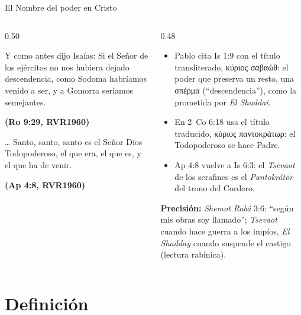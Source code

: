 \documentclass[hyperref={bookmarks=false},aspectratio=169]{beamer}
\newcommand{\grc}[1]{\foreignlanguage{ancientgreek}{#1}}
\newcommand{\fuente}[1]{\par\hfill{\upshape\bfseries\footnotesize\textcolor{azul}{#1}}}
\newcommand{\precision}[1]{{\footnotesize\color{gris}\textbf{Precisión:} #1}}
\begin{document}
\begin{frame}{El Nombre del poder en Cristo}
\begin{columns}[t,onlytextwidth]
\begin{column}{0.50\textwidth}
\begin{cita}Y como antes dijo Isaías: Si el Señor de los ejércitos no nos hubiera dejado descendencia, como Sodoma habríamos venido a ser, y a Gomorra seríamos semejantes.\fuente{(Ro 9:29, RVR1960)}\end{cita}
\begin{cita}[fontupper=\scriptsize\itshape]\ldots{} Santo, santo, santo es el Señor Dios Todopoderoso, el que era, el que es, y el que ha de venir.\fuente{(Ap 4:8, RVR1960)}\end{cita}
\end{column}
\begin{column}{0.48\textwidth}\small
\begin{itemize}
\item Pablo cita Is 1:9 con el título transliterado, \grc{κύριος σαβαώθ}: el poder que preserva un resto, una \grc{σπέρμα} (``descendencia''), como la prometida por \emph{El Shaddai}.
\item En 2~Co 6:18 usa el título traducido, \grc{κύριος παντοκράτωρ}: el Todopoderoso se hace Padre.
\item Ap 4:8 vuelve a Is 6:3: el \emph{Tsevaot} de los serafines es el \emph{Pantokrátōr} del trono del Cordero.
\end{itemize}
\precision{\emph{Shemot Rabá} 3:6: ``según mis obras soy llamado''; \emph{Tsevaot} cuando hace guerra a los impíos, \emph{El Shadday} cuando suspende el castigo (lectura rabínica).}
\end{column}
\end{columns}
\end{frame}

\section{Definición}
\end{document}
